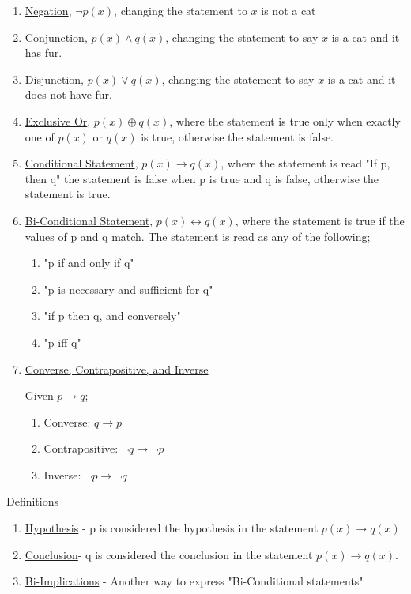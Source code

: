 \documentclass[12pt]{article}
\begin{document}
\begin{enumerate}
\item \underline{Negation}, $\neg p(x)$, changing the statement to $x$ is not a cat
\item \underline{Conjunction}, $p(x) \wedge q(x)$, changing the statement to say $x$ is a cat and it has fur.
\item \underline{Disjunction}, $p(x) \lor q(x)$, changing the statement to say $x$ is a cat and it does not have fur.
\item \underline{Exclusive Or},  $p(x) \oplus q(x)$, where the statement is true only when exactly one of $p(x)$ or $q(x)$ is true, otherwise the statement is false.
\item \underline{Conditional Statement}, $p(x) \rightarrow q(x)$,  where the statement is read "If p, then q" the statement is false when p is true and q is false, otherwise the statement is true.
\item \underline{Bi-Conditional Statement}, $p(x) \leftrightarrow q(x)$, where the statement is true if the values of p and q match. The statement is read as any of the following;
	\begin{enumerate}
	\item "p if and only if q"
	\item "p is necessary and sufficient for q"
	\item "if p then q, and conversely"
	\item "p iff q"
	\end{enumerate}
\item \underline{Converse, Contrapositive, and Inverse}

	Given $p \rightarrow q$;
	\begin{enumerate}
	\item Converse: $q \rightarrow p$
	\item Contrapositive: $\neg q \rightarrow \neg p$
	\item Inverse: $\neg p \rightarrow \neg q$
	\end{enumerate}
\end{enumerate}

Definitions
\begin{enumerate}
\item \underline{Hypothesis} - p is considered the hypothesis in the statement $p(x) \rightarrow q(x)$.
\item \underline{Conclusion}- q is considered the conclusion in the statement $p(x) \rightarrow q(x)$.
\item \underline{Bi-Implications} - Another way to express "Bi-Conditional statements"
\end{enumerate}
\end{document}
